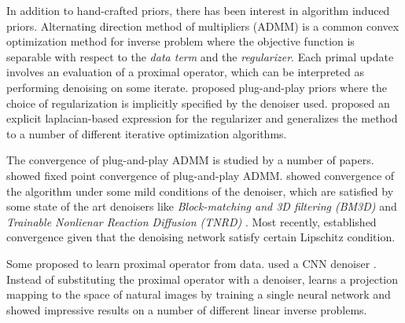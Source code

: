\documentclass[../writeup.tex]{subfiles}
\begin{document}
$ $\\
In addition to hand-crafted priors, there has been interest in algorithm induced priors. Alternating direction method of multipliers (ADMM) is a common convex optimization method for inverse problem where the objective function is separable with respect to the \textit{data term} and the \textit{regularizer}. Each primal update involves an evaluation of a proximal operator, which can be interpreted as performing denoising on some iterate. \cite{venkatakrishnanPlugandPlayPriorsModel2013,heideFlexISPFlexibleCamera2014,chanAlgorithmInducedPriorImage2016} proposed plug-and-play priors where the choice of regularization is implicitly specified by the denoiser used. \cite{romanoLittleEngineThat2016} proposed an explicit laplacian-based expression for the regularizer and generalizes the method to a number of different iterative optimization algorithms.

$ $\\
The convergence of plug-and-play ADMM is studied by a number of papers. \cite{chanPlugandPlayADMMImage2016} showed fixed point convergence of plug-and-play ADMM. \cite{romanoLittleEngineThat2016} showed convergence of the algorithm under some mild conditions of the denoiser, which are satisfied by some state of the art denoisers like \textit{Block-matching and 3D filtering
 (BM3D)} \cite{dabovImageDenoisingSparse2007} and \textit{Trainable Nonlienar Reaction Diffusion (TNRD)} \cite{chenTrainableNonlinearReaction2017}. Most recently, \cite{ryuPlugandPlayMethodsProvably2019} established convergence given that the denoising network satisfy certain Lipschitz condition.

$ $\\ 
Some proposed to learn proximal operator from data. \cite{meinhardtLearningProximalOperators2017} used a CNN denoiser \cite{zhangGaussianDenoiserResidual2017}. Instead of substituting the proximal operator with a denoiser, \cite{changOneNetworkSolve2017} learns a projection mapping to the space of natural images by training a single neural network and showed impressive results on a number of different linear inverse problems.
\end{document}
